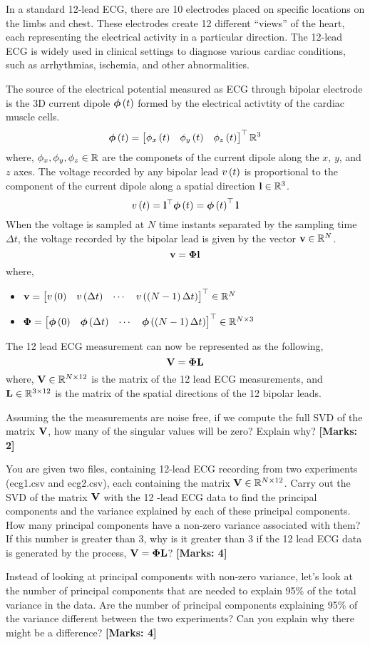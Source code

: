 \documentclass[12pt]{article}
\def\mf{\ensuremath\mathbf}
\def\mb{\ensuremath\mathbb}
\def\lp{\ensuremath\left(}
\def\rp{\ensuremath\right)}
\def\bmx{\ensuremath\begin{bmatrix*}[r]}
\def\emx{\ensuremath\end{bmatrix*}}
\def\bmxc{\ensuremath\begin{bmatrix*}[c]}
\newcommand{\ct}[1]{\lp #1\rp}
\begin{document}
\begin{enumerate}
    In a standard 12-lead ECG, there are 10 electrodes placed on specific locations on the limbs and chest. These electrodes create 12 different ``views'' of the heart, each representing the electrical activity in a particular direction. The 12-lead ECG is widely used in clinical settings to diagnose various cardiac conditions, such as arrhythmias, ischemia, and other abnormalities.
    
    The source of the electrical potential measured as ECG through bipolar electrode is the 3D current dipole $\bm{\phi}\ct{t}$ formed by the electrical activtity of the cardiac muscle cells. 
    \[ \bm{\phi}\ct{t} = \bmx \phi_x\ct{t} & \phi_y\ct{t} & \phi_z\ct{t}\emx^\top \mb{R}^3 \]
    where, $\phi_x, \phi_y, \phi_z \in\mb{R}$ are the componets of the current dipole along the $x$, $y$, and $z$ axes. The voltage recorded by any bipolar lead $v\ct{t}$ is proportional to the component of the current dipole along a spatial direction $\mf{l} \in\mb{R}^3$.
    \[ v\ct{t} = \mf{l}^\top \bm{\phi}\ct{t} = \bm{\phi}\ct{t}^\top\mf{l} \]
    When the voltage is sampled at $N$ time instants separated by the sampling time $\Delta t$, the voltage recorded by the bipolar lead is given by the vector $\mf{v} \in\mb{R}^N$.
    \[ \mf{v} = \bm{\Phi} \mf{l} \]
    where, 
    \begin{itemize}
        \item $\mf{v} = \bmxc v\ct{0} & v\ct{\Delta t} & \cdots & v\ct{\ct{N-1}\Delta t} \emx^\top \in \mb{R}^N$
        \item $\bm{\Phi} =\bmx \bm{\phi}\ct{0} & \bm{\phi}\ct{\Delta t} & \cdots & \bm{\phi}\ct{\ct{N - 1}\Delta t} \emx^\top \in \mb{R}^{N \times 3}$
    \end{itemize}
    The 12 lead ECG measurement can now be represented as the following,
    \[ \mf{V} = \bm{\Phi} \mf{L} \]
    where, $\mf{V} \in \mb{R}^{N \times 12}$ is the matrix of the 12 lead ECG measurements, and $\mf{L} \in \mb{R}^{3 \times 12}$ is the matrix of the spatial directions of the 12 bipolar leads. 

    Assuming the the measurements are noise free, if we compute the full SVD of the matrix $\mf{V}$, how many of the singular values will be zero? Explain why? \textbf{[Marks: 2]}

    You are given two files, containing 12-lead ECG recording from two experiments (ecg1.csv and ecg2.csv), each containing the matrix $\mf{V} \in \mb{R}^{N \times 12}$. Carry out the SVD of the matrix $\mf{V}$ with the 12 -lead ECG data to find the principal components and the variance explained by each of these principal components. How many principal components have a non-zero variance associated with them? If this number is greater than 3, why is it greater than 3 if the 12 lead ECG data is generated by the process, $\mf{V} = \bm{\Phi}\mf{L}$? \textbf{[Marks: 4]}
    
    Instead of looking at principal components with non-zero variance, let's look at the number of principal components that are needed to explain 95\% of the total variance in the data. Are the number of principal components  explaining 95\% of the variance different between the two experiments? Can you explain why there might be a difference? \textbf{[Marks: 4]}
\end{enumerate}
\end{document}
